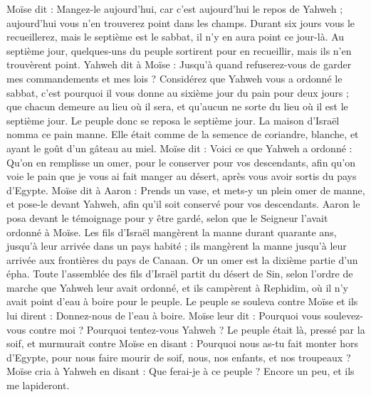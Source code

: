 \begin{multicols}{2}
Moïse dit : Mangez-le aujourd'hui, car c'est aujourd'hui le repos de Yahweh ; aujourd'hui vous n'en trouverez point dans les champs.
Durant six jours vous le recueillerez, mais le septième est le sabbat, il n'y en aura point ce jour-là.
Au septième jour, quelques-uns du peuple sortirent pour en recueillir, mais ils n'en trouvèrent point.
Yahweh dit à Moïse : Jusqu’à quand refuserez-vous de garder mes commandements et mes lois ?
Considérez que Yahweh vous a ordonné le sabbat, c'est pourquoi il vous donne au sixième jour du pain pour deux jours ; que chacun demeure au lieu où il sera, et qu'aucun ne sorte du lieu où il est le septième jour.
Le peuple donc se reposa le septième jour.
La maison d'Israël nomma ce pain manne. Elle était comme de la semence de coriandre, blanche, et ayant le goût d’un gâteau au miel.
Moïse dit : Voici ce que Yahweh a ordonné : Qu'on en remplisse un omer, pour le conserver pour vos descendants, afin qu'on voie le pain que je vous ai fait manger au désert, après vous avoir sortis du pays d'Egypte.
Moïse dit à Aaron : Prends un vase, et mets-y un plein omer de manne, et pose-le devant Yahweh, afin qu’il soit conservé pour vos descendants.
Aaron le posa devant le témoignage pour y être gardé, selon que le Seigneur l'avait ordonné à Moïse.
Les fils d'Israël mangèrent la manne durant quarante ans, jusqu'à leur arrivée dans un pays habité ; ils mangèrent la manne jusqu'à leur arrivée aux frontières du pays de Canaan.
Or un omer est la dixième partie d'un épha.
\VerseOne{}Toute l'assemblée des fils d'Israël partit du désert de Sin, selon l’ordre de marche que Yahweh leur avait ordonné, et ils campèrent à Rephidim, où il n'y avait point d'eau à boire pour le peuple.
Le peuple se souleva contre Moïse et ils lui dirent : Donnez-nous de l'eau à boire. Moïse leur dit : Pourquoi vous soulevez-vous contre moi ? Pourquoi tentez-vous Yahweh ?
Le peuple était là, pressé par la soif, et murmurait contre Moïse en disant : Pourquoi nous as-tu fait monter hors d'Egypte, pour nous faire mourir de soif, nous, nos enfants, et nos troupeaux ?
Moïse cria à Yahweh en disant : Que ferai-je à ce peuple ? Encore un peu, et ils me lapideront.

\end{multicols}
